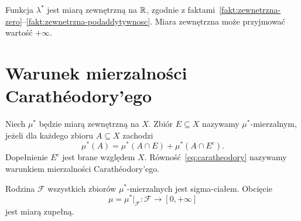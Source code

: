 \begin{uwaga}
Funkcja $\lambda^{\ast}$ jest miarą zewnętrzną na $\mathbb{R}$, zgodnie
z faktami~\ref{fakt:zewnetrzna-zero}--\ref{fakt:zewnetrzna-podaddytywnosc}.
Miara zewnętrzna może przyjmować wartość $+\infty$.
\end{uwaga}

\section{Warunek mierzalności Carathéodory'ego}
\label{sec:caratheodory}

\begin{definicja}
\label{def:caratheodory}
Niech $\mu^{\ast}$ będzie miarą zewnętrzną na $X$.
Zbiór $E\subseteq X$ nazywamy $\mu^{\ast}$-mierzalnym, jeżeli
dla każdego zbioru $A\subseteq X$ zachodzi
\begin{equation}
  \mu^{\ast}(A)
  =\mu^{\ast}(A\cap E)+\mu^{\ast}(A\cap E^c).
  \label{eq:caratheodory}
\end{equation}
Dopełnienie $E^c$ jest brane względem $X$.
Równość~\eqref{eq:caratheodory} nazywamy warunkiem mierzalności
Carathéodory'ego.
\end{definicja}

\begin{twierdzenie}
\label{tw:caratheodory}
Rodzina $\mathcal{F}$ wszystkich zbiorów $\mu^{\ast}$-mierzalnych
jest sigma-ciałem. Obcięcie
\[
  \mu=\mu^{\ast}|_{\mathcal{F}}
  \colon\mathcal{F}\longrightarrow[0,+\infty]
\]
jest miarą zupełną.
\end{twierdzenie}


